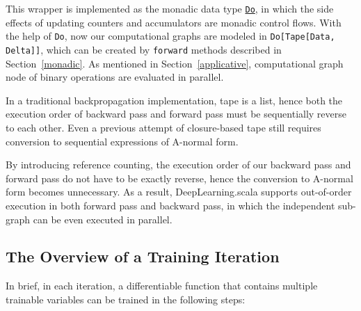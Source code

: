 This wrapper is implemented as the monadic data type \href{https://javadoc.io/page/com.thoughtworks.raii/asynchronous_2.11/latest/com/thoughtworks/raii/asynchronous%24%24Do.html}{\lstinline{Do}}, in which the side effects of updating counters and accumulators are monadic control flows. With the help of \lstinline{Do}, now our \glspl{computational graph} are modeled in \lstinline{Do[Tape[Data, Delta]]}, which can be created by \lstinline{forward} methods described in Section~\ref{monadic}. As mentioned in Section~\ref{applicative}, \gls{computational graph} node of binary operations are evaluated in parallel.

In a traditional backpropagation implementation, tape is a list, hence both the execution order of backward pass and forward pass must be sequentially reverse to each other. Even a previous attempt of closure-based tape\cite{pearlmutter2008reverse} still requires conversion to sequential expressions of A-normal form\cite{sabry1993reasoning}. 

By introducing reference counting, the execution order of our backward pass and forward pass do not have to be exactly reverse, hence the conversion to A-normal form becomes unnecessary. As a result, DeepLearning.scala supports out-of-order execution in both forward pass and backward pass, in which the independent sub-graph can be even executed in parallel.

\subsection{The Overview of a Training Iteration}\label{training iteration}

In brief, in each iteration, a \gls{differentiable function} that contains multiple \glspl{trainable variable} can be trained in the following steps:

